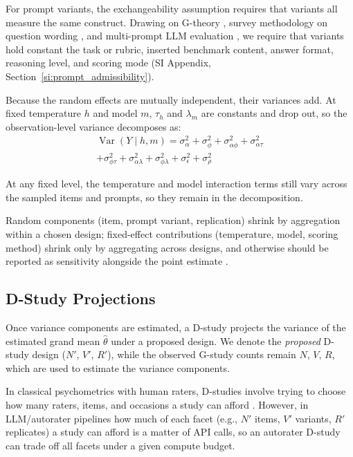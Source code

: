 \documentclass{article}
\DeclareMathOperator{\Var}{Var}
\begin{document}
For prompt variants, the exchangeability assumption requires that variants all measure the same construct. Drawing on G-theory \citep{cronbach1972dependability, brennan2001gtheory}, survey methodology on question wording \citep{groves2010survey}, and multi-prompt LLM evaluation \citep{mizrahi2024multiprompt, sclar2024sensitivity, barrie2024pss}, we require that variants hold constant the task or rubric, inserted benchmark content, answer format, reasoning level, and scoring mode (SI Appendix, Section~\ref{si:prompt_admissibility}).

Because the random effects are mutually independent, their variances add. At fixed temperature $h$ and model $m$, $\tau_h$ and $\lambda_m$ are constants and drop out, so the observation-level variance decomposes as:
\begin{equation}
\label{eq:tle}
\begin{split}
\Var(Y \mid h, m) = \sigma^2_\alpha + \sigma^2_\phi + \sigma^2_{\alpha\phi} + \sigma^2_{\alpha\tau} \\
+ \sigma^2_{\phi\tau} + \sigma^2_{\alpha\lambda} + \sigma^2_{\phi\lambda} + \sigma^2_\epsilon + \sigma^2_\rho
\end{split}
\end{equation}

At any fixed level, the temperature and model interaction terms still vary across the sampled items and prompts, so they remain in the decomposition.


Random components (item, prompt variant, replication) shrink by aggregation within a chosen design; fixed-effect contributions (temperature, model, scoring method) shrink only by aggregating across designs, and otherwise should be reported as sensitivity alongside the point estimate \citep{steegen2016multiverse}.

\subsection{D-Study Projections}
\label{sec:dstudy}

Once variance components are estimated, a D-study projects the variance of the estimated grand mean $\hat{\theta}$ under a proposed design. We denote the \emph{proposed} D-study design ($N'$, $V'$, $R'$), while the observed G-study counts remain $N$, $V$, $R$, which are used to estimate the variance components. %

 In classical psychometrics with human raters, D-studies involve trying to choose how many raters, items, and occasions a study can afford \citep{brennan2001gtheory}. However, in LLM/autorater pipelines how much of each facet (e.g., $N'$ items, $V'$ variants, $R'$ replicates) a study can afford is a matter of API calls, so an autorater D-study can trade off all facets under a given compute budget.
\end{document}
